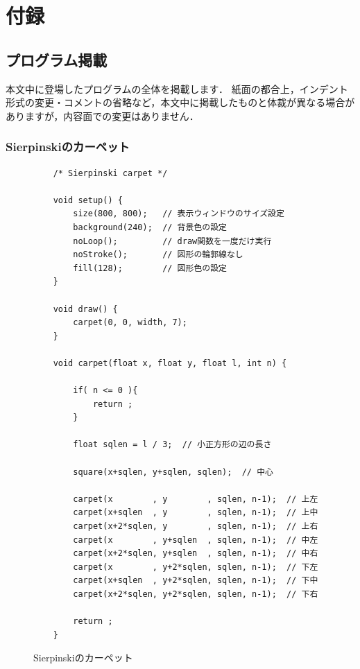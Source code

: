 \documentclass[dvipdfmx]{jsarticle}
\theoremstyle{definition}
\begin{document}
\section{付録}

\subsection{プログラム掲載}

本文中に登場したプログラムの全体を掲載します．
紙面の都合上，インデント形式の変更・コメントの省略など，本文中に掲載したものと体裁が異なる場合がありますが，内容面での変更はありません．


\subsubsection{Sierpinskiのカーペット}
\label{code_carpet_all}
\begin{figure}[ht]
\begin{center}
\begin{oframed}
\footnotesize
\begin{verbatim}
    /* Sierpinski carpet */

    void setup() {
        size(800, 800);   // 表示ウィンドウのサイズ設定
        background(240);  // 背景色の設定
        noLoop();         // draw関数を一度だけ実行
        noStroke();       // 図形の輪郭線なし
        fill(128);        // 図形色の設定
    }

    void draw() {
        carpet(0, 0, width, 7);
    }

    void carpet(float x, float y, float l, int n) {

        if( n <= 0 ){
            return ;
        }

        float sqlen = l / 3;  // 小正方形の辺の長さ

        square(x+sqlen, y+sqlen, sqlen);  // 中心

        carpet(x        , y        , sqlen, n-1);  // 上左
        carpet(x+sqlen  , y        , sqlen, n-1);  // 上中
        carpet(x+2*sqlen, y        , sqlen, n-1);  // 上右
        carpet(x        , y+sqlen  , sqlen, n-1);  // 中左
        carpet(x+2*sqlen, y+sqlen  , sqlen, n-1);  // 中右
        carpet(x        , y+2*sqlen, sqlen, n-1);  // 下左
        carpet(x+sqlen  , y+2*sqlen, sqlen, n-1);  // 下中
        carpet(x+2*sqlen, y+2*sqlen, sqlen, n-1);  // 下右

        return ;
    }
\end{verbatim}
\end{oframed}
\end{center}
\caption{Sierpinskiのカーペット}
\end{figure}
\end{document}

